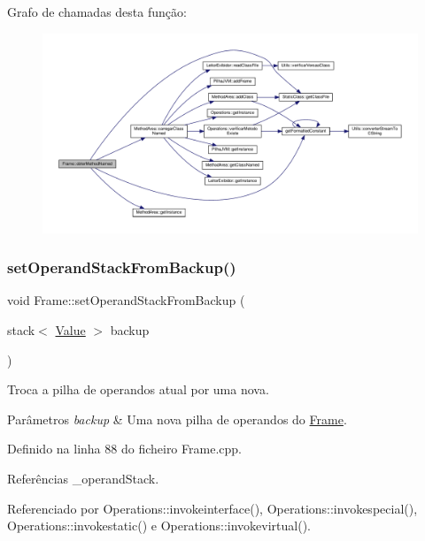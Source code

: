 Grafo de chamadas desta função\+:\nopagebreak
\begin{figure}[H]
\begin{center}
\leavevmode
\includegraphics[width=350pt]{classFrame_a9920bdecf44e07796b7feea5bc4f1a6c_cgraph}
\end{center}
\end{figure}
\mbox{\label{classFrame_afda87a144c907a9220ea2209ad3cd429}} 
\subsubsection{\texorpdfstring{set\+Operand\+Stack\+From\+Backup()}{setOperandStackFromBackup()}}
{\footnotesize\ttfamily void Frame\+::set\+Operand\+Stack\+From\+Backup (\begin{DoxyParamCaption}\item[{stack$<$ \hyperlink{structValue}{Value} $>$}]{backup }\end{DoxyParamCaption})}



Troca a pilha de operandos atual por uma nova. 


\begin{DoxyParams}{Parâmetros}
{\em backup} & Uma nova pilha de operandos do \hyperlink{classFrame}{Frame}. \\
\hline
\end{DoxyParams}


Definido na linha 88 do ficheiro Frame.\+cpp.



Referências \+\_\+operand\+Stack.



Referenciado por Operations\+::invokeinterface(), Operations\+::invokespecial(), Operations\+::invokestatic() e Operations\+::invokevirtual().

